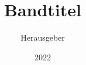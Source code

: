 \documentclass[ngerman,collection=true]{unigrazpub}
\title{Bandtitel}
\author{Herausgeber}
\date{2022}
\begin{document}


\tableofcontents
	

%
%

\appendix

\listofauthors
\end{document}
